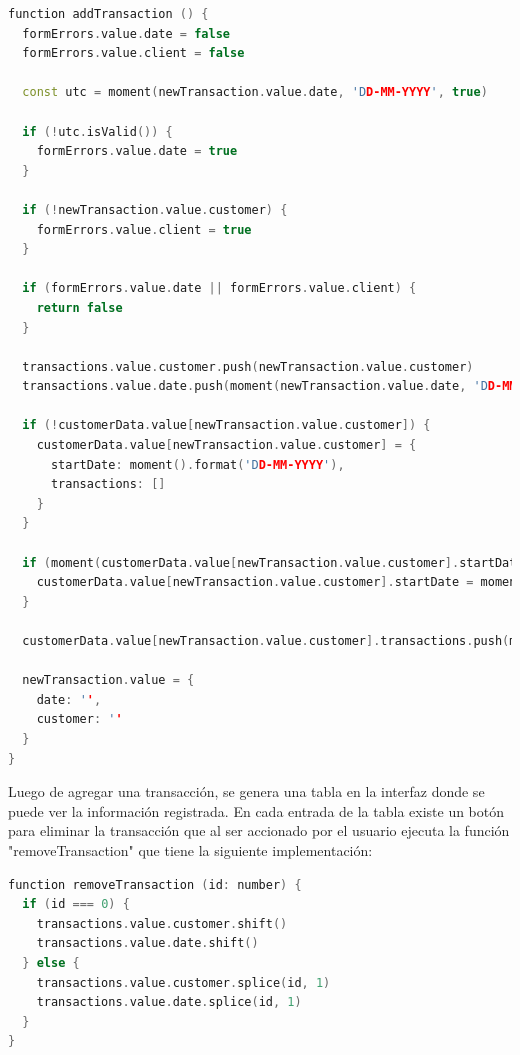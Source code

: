 \begin{lstlisting}[language=C++, caption=addTransaction en index.vue]
function addTransaction () {
  formErrors.value.date = false
  formErrors.value.client = false

  const utc = moment(newTransaction.value.date, 'DD-MM-YYYY', true)

  if (!utc.isValid()) {
    formErrors.value.date = true
  }

  if (!newTransaction.value.customer) {
    formErrors.value.client = true
  }

  if (formErrors.value.date || formErrors.value.client) {
    return false
  }

  transactions.value.customer.push(newTransaction.value.customer)
  transactions.value.date.push(moment(newTransaction.value.date, 'DD-MM-YYYY').format('DD-MM-YYYY'))

  if (!customerData.value[newTransaction.value.customer]) {
    customerData.value[newTransaction.value.customer] = {
      startDate: moment().format('DD-MM-YYYY'),
      transactions: []
    }
  }

  if (moment(customerData.value[newTransaction.value.customer].startDate, 'DD-MM-YYYY') > moment(newTransaction.value.date, 'DD-MM-YYYY')) {
    customerData.value[newTransaction.value.customer].startDate = moment(newTransaction.value.date, 'DD-MM-YYYY').format('DD-MM-YYYY')
  }

  customerData.value[newTransaction.value.customer].transactions.push(moment(newTransaction.value.date, 'DD-MM-YYYY').format('DD-MM-YYYY'))

  newTransaction.value = {
    date: '',
    customer: ''
  }
}
\end{lstlisting}	

Luego de agregar una transacción, se genera una tabla en la interfaz donde se puede ver la información registrada. En cada entrada de la tabla existe un botón para eliminar la transacción que al ser accionado por el usuario ejecuta la función "removeTransaction" que tiene la siguiente implementación:

\begin{lstlisting}[language=C++, caption=removeTransaction en index.vue]
function removeTransaction (id: number) {
  if (id === 0) {
    transactions.value.customer.shift()
    transactions.value.date.shift()
  } else {
    transactions.value.customer.splice(id, 1)
    transactions.value.date.splice(id, 1)
  }
}
\end{lstlisting}	

